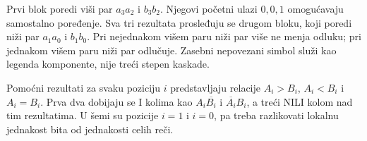 Prvi blok poredi viši par $a_3a_2$ i $b_3b_2$. Njegovi početni ulazi $0,0,1$ omogućavaju samostalno poređenje. Sva tri rezultata prosleđuju se drugom bloku, koji poredi niži par $a_1a_0$ i $b_1b_0$. Pri nejednakom višem paru niži par više ne menja odluku; pri jednakom višem paru niži par odlučuje. Zasebni nepovezani simbol služi kao legenda komponente, nije treći stepen kaskade.

Pomoćni rezultati za svaku poziciju $i$ predstavljaju relacije $A_i>B_i$, $A_i<B_i$ i $A_i=B_i$. Prva dva dobijaju se I kolima kao $A_i\overline{B_i}$ i $\overline{A_i}B_i$, a treći NILI kolom nad tim rezultatima. U šemi su pozicije $i=1$ i $i=0$, pa treba razlikovati lokalnu jednakost bita od jednakosti celih reči.
